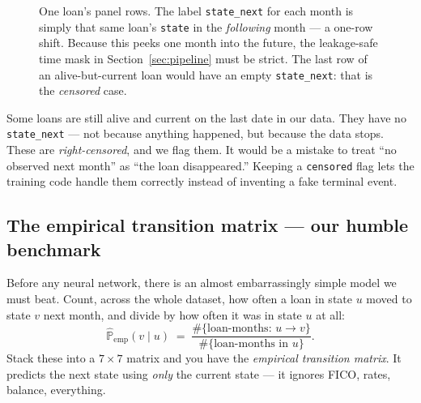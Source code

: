 \documentclass[11pt]{article}
\newcommand{\Prob}{\mathbb{P}}
\begin{document}
\begin{figure}[H]
\centering
{}
\caption{One loan's panel rows. The label \texttt{state\_next} for each month is simply that
same loan's \texttt{state} in the \emph{following} month --- a one-row shift. Because this
peeks one month into the future, the leakage-safe time mask in
Section~\ref{sec:pipeline} must be strict. The last row of an alive-but-current loan would
have an empty \texttt{state\_next}: that is the \emph{censored} case.}
\end{figure}

\begin{intuition}
Some loans are still alive and current on the last date in our data. They have no
\texttt{state\_next} --- not because anything happened, but because the data stops. These
are \emph{right-censored}, and we flag them. It would be a mistake to treat ``no
observed next month'' as ``the loan disappeared.'' Keeping a \texttt{censored} flag lets
the training code handle them correctly instead of inventing a fake terminal event.
\end{intuition}

\subsection{The empirical transition matrix --- our humble benchmark}

Before any neural network, there is an almost embarrassingly simple model we must beat.
Count, across the whole dataset, how often a loan in state $u$ moved to state $v$ next
month, and divide by how often it was in state $u$ at all:
\[
  \widehat{\Prob}_{\text{emp}}(v \mid u)
  \;=\; \frac{\#\{\text{loan-months: } u \to v\}}{\#\{\text{loan-months in } u\}}.
\]
Stack these into a $7\times 7$ matrix and you have the \emph{empirical transition
matrix}. It predicts the next state using \emph{only} the current state --- it ignores
FICO, rates, balance, everything.
\end{document}
